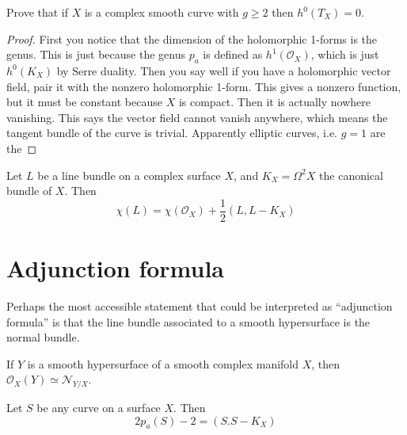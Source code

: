 \begin{exercise}
\label{exercise-no-holomorphic-vector-fields-for-g-geq2}
Prove that if $X$ is a complex smooth curve with $g\geq 2$ then $h^0(T_X)=0$.
\end{exercise}

\begin{proof}
First you notice that the dimension of the holomorphic 1-forms is the genus.
This is just because the genus $p_a$ is defined as $h^1(\mathcal{O}_X)$, which
is just $h^0(K_X)$ by Serre duality. Then you say well if you have a holomorphic
vector field, pair it with the nonzero holomorphic 1-form. This gives a nonzero
function, but it must be constant because $X$ is compact. Then it is actually
nowhere vanishing. This says the vector field cannot vanish anywhere, which
means the tangent bundle of the curve is trivial. Apparently elliptic curves,
i.e. $g=1$ are the 
\end{proof}


\begin{theorem}
\label{theorem-Riemann-Roch-for-line-bundles-on-surfaces}
Let $L$ be a line bundle on a complex surface $X$, and $K_X=\Omega^2X$ the
canonical bundle of $X$. Then
\begin{equation}
\label{equation-Riemann-Roch-for-line-bundles-on-surfaces}
\chi(L)=\chi(\mathcal{O}_X)+\frac{1}{2}(L,L-K_X)
\end{equation}
\end{theorem}

\section{Adjunction formula}
\label{section-adjunction-formula}

Perhaps the most accessible statement that could be interpreted as ``adjunction
formula'' is that the line bundle associated to a smooth hypersurface is the
normal bundle.

\begin{theorem}
\label{theorem-adjunction-formula-1}
\begin{reference}
\cite[p.146]{GH}
\end{reference}
If $Y$ is a smooth hypersurface of a smooth complex manifold $X$, then
$\mathcal{O}_X(Y) \simeq \mathcal{N}_{Y/X}$.
\end{theorem}

\begin{lemma}
\label{lemma-adjunction-formula-for-curves-on-surfaces}
Let $S$ be any curve on a surface $X$. Then
\begin{equation}
\label{equation-adjunction-formula-for-curves-on-surfaces}
2p_a(S)-2=(S.S-K_X)
\end{equation}
\end{lemma}

